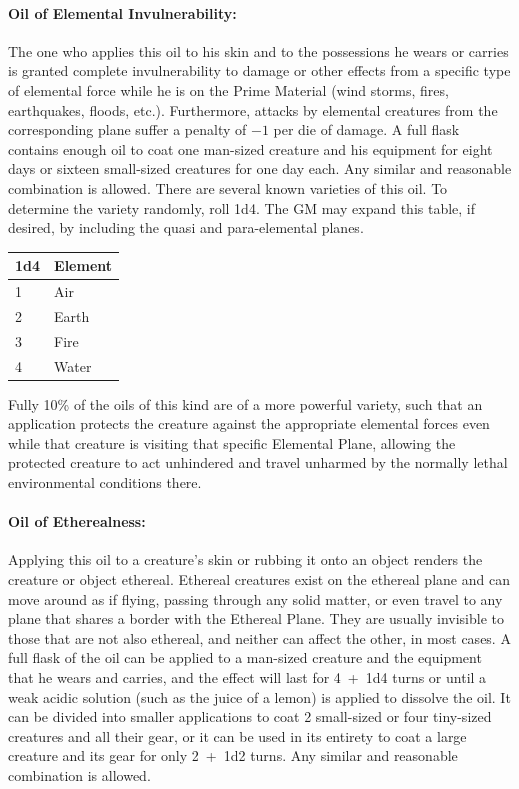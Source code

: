 \begin{multicols}{2}
\paragraph{Oil of Elemental Invulnerability:} The one who applies this oil to his skin and to the possessions he wears or carries is granted complete invulnerability to damage or other effects from a specific type of elemental force while he is on the Prime Material (wind storms, fires, earthquakes, floods, etc.).  Furthermore, attacks by elemental creatures from the corresponding plane suffer a penalty of $-1$ per die of damage.  A full flask contains enough oil to coat one man-sized creature and his equipment for eight days or sixteen small-sized creatures for one day each.  Any similar and reasonable combination is allowed.  There are several known varieties of this oil.  To determine the variety randomly, roll 1d4.  The GM may expand this table, if desired, by including the quasi and para-elemental planes.

\noindent
\begin{tabular}{|p{}|p{}|}
\hline
1d4	& Element \\
\hline\hline
\rowcolor[gray]{.9}1	& Air \\
2	& Earth \\
\rowcolor[gray]{.9}3	& Fire \\
4	& Water \\
\hline
\end{tabular}

Fully 10\% of the oils of this kind are of a more powerful variety, such that an application protects the creature against the appropriate elemental forces even while that creature is visiting that specific Elemental Plane, allowing the protected creature to act unhindered and travel unharmed by the normally lethal environmental conditions there. 

\paragraph{Oil of Etherealness:} Applying this oil to a creature's skin or rubbing it onto an object renders the creature or object ethereal.  Ethereal creatures exist on the ethereal plane and can move around as if flying, passing through any solid matter, or even travel to any plane that shares a border with the Ethereal Plane.  They are usually invisible to those that are not also ethereal, and neither can affect the other, in most cases.  A full flask of the oil can be applied to a man-sized creature and the equipment that he wears and carries, and the effect will last for 4~+~1d4 turns or until a weak acidic solution (such as the juice of a lemon) is applied to dissolve the oil.  It can be divided into smaller applications to coat 2 small-sized or four tiny-sized creatures and all their gear, or it can be used in its entirety to coat a large creature and its gear for only 2~+~1d2 turns.  Any similar and reasonable combination is allowed.


\end{multicols}
